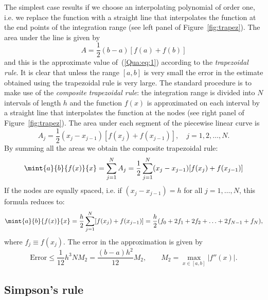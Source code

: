 The simplest case results if we choose an interpolating polynomial of
order one, i.e. we replace the function with a straight line that
interpolates the function at the end points of the integration range
(see left panel of Figure~\ref{fig:trapez}).   The area under the line
is given by
%
\begin{equation}
  A = \frac{1}{2} (b-a) [f(a) + f(b)]
  \label{Qua:eq:32}
\end{equation}
%
and this is the approximate value of~(\ref{Qua:eq:1}) according to the
\textit{trapezoidal rule}.  It is clear that unless the range $[a,b]$
is very small the error in the estimate obtained using the trapezoidal
rule is very large.  The standard procedure is to make use of the
\textit{composite trapezoidal rule}: the integration range is divided
into $N$ intervals of length $h$ and the function $f(x)$ is
approximated on each interval by a straight line that interpolates the
function at the nodes (see right panel of Figure~\ref{fig:trapez}).
The area under each segment of the piecewise linear curve is
%
\begin{equation}
  A_j = \frac{1}{2} (x_{j}-x_{j-1}) [f(x_{j})+f(x_{j-1})] , \quad
  j = 1,2, \ldots, N.
  \label{Qua:eq:4}
\end{equation}
%
By summing all the areas we obtain the composite trapezoidal rule:
%
\begin{equation}
  \mint{a}{b}{f(x)}{x} = \sum_{j=1}^{N} A_j =
  \frac{1}{2} \sum_{j=1}^{N} (x_{j}-x_{j-1}) [f(x_{j})+f(x_{j-1})]
  \label{Qua:eq:5}
\end{equation}
%
If the nodes are equally spaced, i.e. if $(x_{j}-x_{j-1}) = h$ for all
$j=1, \ldots, N$, this formula reduces to:
%
\begin{equation}
 \mint{a}{b}{f(x)}{x} =
  \frac{h}{2} \sum_{j=1}^{N} [f(x_{j})+f(x_{j-1})] =
  \frac{h}{2} ( f_0 + 2 f_1 + 2 f_2 + \ldots + 2 f_{N-1} + f_N ) ,
\label{Qua:eq:12}
\end{equation}
%
where $f_j \equiv f(x_j)$.  The error in the approximation is given by
%
\begin{equation}
  \text{Error} \le \frac{1}{12} h^3 N M_2 =
  \frac{(b-a) h^2}{12} M_2 , \qquad
  M_2 = \max_{x\in[a,b]} |f''(x)| .
  \label{Qua:eq:6}
\end{equation}

\subsection{Simpson's rule}

